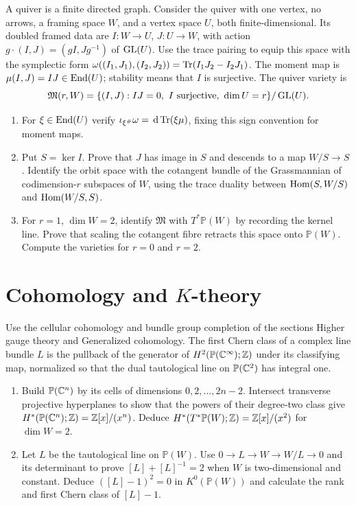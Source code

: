 \begin{exercise}
A quiver is a finite directed graph. Consider the quiver with one
vertex, no arrows, a framing space $W$, and a vertex space $U$,
both finite-dimensional. Its doubled framed data are
$I:W\to U$, $J:U\to W$, with action
$g\cdot(I,J)=(gI,Jg^{-1})$ of $\operatorname{GL}(U)$.
Use the trace pairing to equip this space with the symplectic
form $\omega((I_1,J_1),(I_2,J_2))=\operatorname{Tr}(I_1J_2-I_2J_1)$.
The moment map is $\mu(I,J)=IJ\in\operatorname{End}(U)$; stability means that
$I$ is surjective. The quiver variety is
\[
 \mathfrak M(r,W)=\{(I,J):IJ=0,\ I\text{ surjective},
                       \ \dim U=r\}/\operatorname{GL}(U).
\]
\begin{enumerate}[label=(\alph*)]
\item For $\xi\in\operatorname{End}(U)$ verify
$\iota_{\xi^\#}\omega=\,\mathrm d\operatorname{Tr}(\xi\mu)$, fixing this sign
convention for moment maps.
\item Put $S=\ker I$. Prove that $J$ has image in $S$ and
descends to a map $W/S\to S$. Identify the orbit space with
the cotangent bundle of the Grassmannian of codimension-$r$
subspaces of $W$, using the trace duality between
$\operatorname{Hom}(S,W/S)$ and $\operatorname{Hom}(W/S,S)$.
\item For $r=1$, $\dim W=2$, identify $\mathfrak M$ with
$T^*\mathbb P(W)$ by recording the kernel line. Prove that
scaling the cotangent fibre retracts this space onto
$\mathbb P(W)$. Compute the varieties for $r=0$ and $r=2$.
\end{enumerate}
\end{exercise}

\section{\texorpdfstring{Cohomology and $K$-theory}{Cohomology and K-theory}}

\begin{exercise}
Use the cellular cohomology and bundle group completion of the
sections Higher gauge theory and Generalized cohomology.
The first Chern class of a complex line bundle $L$ is the pullback
of the generator of $H^2(\mathbb P(\mathbb C^\infty);\mathbb Z)$ under its
classifying map, normalized so that the dual tautological line
on $\mathbb P(\mathbb C^2)$ has integral one.
\begin{enumerate}[label=(\alph*)]
\item Build $\mathbb P(\mathbb C^n)$ by its cells of dimensions
$0,2,\dots,2n-2$. Intersect transverse projective hyperplanes
to show that the powers of their degree-two class give
$H^*(\mathbb P(\mathbb C^n);\mathbb Z)=\mathbb Z[x]/(x^n)$.
Deduce $H^*(T^*\mathbb P(W);\mathbb Z)=\mathbb Z[x]/(x^2)$ for $\dim W=2$.
\item Let $L$ be the tautological line on $\mathbb P(W)$.
Use $0\to L\to W\to W/L\to0$ and its determinant to prove
$[L]+[L]^{-1}=2$ when $W$ is two-dimensional and constant.
Deduce $([L]-1)^2=0$ in $K^0(\mathbb P(W))$ and calculate
the rank and first Chern class of $[L]-1$.
\end{enumerate}
\end{exercise}

